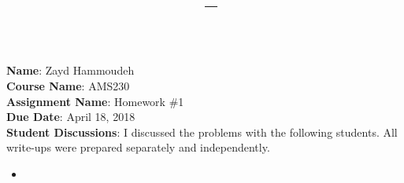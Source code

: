 \documentclass{report}
\title{\textbf{\course\ -- \assnName}}
\author{\name}
\newcommand{\course}{AMS230}
\newcommand{\assnName}{Homework \#1}
\begin{document}
  \maketitle

  \noindent
  \textbf{Name}: Zayd Hammoudeh \\
  \textbf{Course Name}: \course \\
  \textbf{Assignment Name}: \assnName \\
  \textbf{Due Date}: April 18, 2018 \\
  \textbf{Student Discussions}: I discussed the problems with the following students.  All write-ups were prepared separately and independently. \\
  \begin{itemize}
    \item 
  \end{itemize}

  \newpage
  
  
  \newpage
  
  
  \newpage
  
  
  \newpage
  
  
  \newpage
  
  
  \newpage
  
\end{document}
